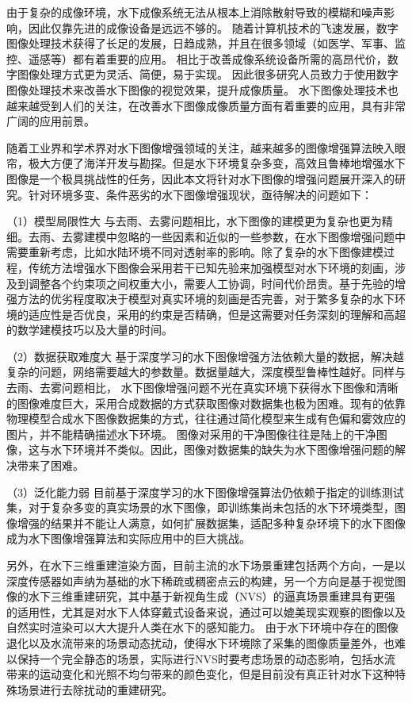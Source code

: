 由于复杂的成像环境，水下成像系统无法从根本上消除散射导致的模糊和噪声影响，因此仅靠先进的成像设备是远远不够的。
随着计算机技术的飞速发展，数字图像处理技术获得了长足的发展，日趋成熟，并且在很多领域（如医学、军事、监控、遥感等）都有着重要的应用。
相比于改善成像系统设备所需的高昂代价，数字图像处理方式更为灵活、简便，易于实现。
因此很多研究人员致力于使用数字图像处理技术来改善水下图像的视觉效果，提升成像质量。
水下图像处理技术也越来越受到人们的关注，在改善水下图像成像质量方面有着重要的应用，具有非常广阔的应用前景。

随着工业界和学术界对水下图像增强领域的关注，越来越多的图像增强算法映入眼帘，极大方便了海洋开发与勘探。但是水下环境复杂多变，高效且鲁棒地增强水下图像是一个极具挑战性的任务，因此本文将针对水下图像的增强问题展开深入的研究。针对环境多变、条件恶劣的水下图像增强现状，亟待解决的问题如下：

（1）模型局限性大
与去雨、去雾问题相比，水下图像的建模更为复杂也更为精细。去雨、去雾建模中忽略的一些因素和近似的一些参数，在水下图像增强问题中需要重新考虑，比如水陆环境不同对透射率的影响。除了复杂的水下图像建模过程，传统方法增强水下图像会采用若干已知先验来加强模型对水下环境的刻画，涉及到调整各个约束项之间权重大小，需要人工协调，时间代价昂贵。基于先验的增强方法的优劣程度取决于模型对真实环境的刻画是否完善，对于繁多复杂的水下环境的适应性是否优良，采用的约束是否精确，但是这需要对任务深刻的理解和高超的数学建模技巧以及大量的时间。

（2）数据获取难度大
基于深度学习的水下图像增强方法依赖大量的数据，解决越复杂的问题，网络需要越大的参数量。数据量越大，深度模型鲁棒性越好。同样与去雨、去雾问题相比， 水下图像增强问题不光在真实环境下获得水下图像和清晰的图像难度巨大，采用合成数据的方式获取图像对数据集也极为困难。现有的依靠物理模型合成水下图像数据集的方式，往往通过简化模型来生成有色偏和雾效应的图片，并不能精确描述水下环境。 图像对采用的干净图像往往是陆上的干净图像，这与水下环境并不类似。因此，图像对数据集的缺失为水下图像增强问题的解决带来了困难。

（3）泛化能力弱
目前基于深度学习的水下图像增强算法仍依赖于指定的训练测试集，对于复杂多变的真实场景的水下图像，即训练集尚未包括的水下环境类型，图像增强的结果并不能让人满意，如何扩展数据集，适配多种复杂环境下的水下图像成为水下图像增强算法和实际应用中的巨大挑战。

另外，在水下三维重建渲染方面，目前主流的水下场景重建包括两个方向，一是以深度传感器如声纳为基础的水下稀疏或稠密点云的构建，另一个方向是基于视觉图像的水下三维重建研究，其中基于新视角生成（NVS）的逼真场景重建具有更强的适用性，尤其是对水下人体穿戴式设备来说，通过可以媲美现实观察的图像以及自然实时渲染可以大大提升人类在水下的感知能力。
由于水下环境中存在的图像退化以及水流带来的场景动态扰动，使得水下环境除了采集的图像质量差外，也难以保持一个完全静态的场景，实际进行NVS时要考虑场景的动态影响，包括水流带来的运动变化和光照不均匀带来的颜色变化，但是目前没有真正针对水下这种特殊场景进行去除扰动的重建研究。

